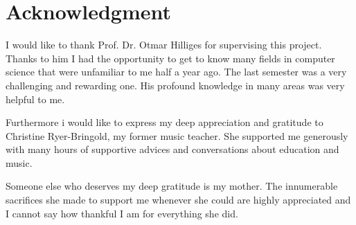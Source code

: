 
\chapter*{Acknowledgment}

I would like to thank Prof. Dr. Otmar Hilliges for supervising this project. Thanks to him I had the opportunity to get to know many fields in computer science that were unfamiliar to me half a year ago. The last semester was a very challenging and rewarding one. His profound knowledge in many areas was very helpful to me.

Furthermore i would like to express my deep appreciation and gratitude to Christine Ryer-Bringold, my former music teacher. She supported me generously with many hours of supportive advices and conversations about education and music. 

Someone else who deserves my deep gratitude is my mother. The innumerable sacrifices she made to support me whenever she could are highly appreciated and I cannot say how thankful I am for everything she did.
